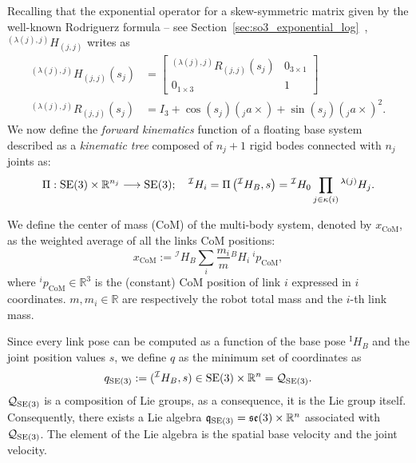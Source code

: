 Recalling that the exponential operator for a skew-symmetric matrix given by the well-known Rodriguerz formula -- see Section~\ref{sec:so3_exponential_log}~\citep{Murray1994}, ${}^{(\lambda(j), j)}H_{(j, j)}$ writes as
\begin{equation}
\begin{split}
	{}^{(\lambda(j), j)}H_{(j, j)}(s_j) &= \begin{bmatrix}
	{}^{(\lambda(j), j)}R_{(j, j)}(s_j)  & 0_{3 \times 1} \\
	0_{1 \times 3} & 1
	\end{bmatrix} \\
	{}^{(\lambda(j), j)}R_{(j, j)}(s_j) &= I_3 + \cos(s_j)({}_j a \times) + \sin(s_j)({}_j a \times)^2.
\end{split}
\end{equation}
We now define the \emph{forward kinematics} function of a floating base system described as a \emph{kinematic tree} composed of $n_j + 1$ rigid bodes connected with $n_j$ joints as:
\begin{equation}
    \operatorname{\Pi} : {\mathrm{SE}}(3) \times \mathbb{R}^{n_j} \longrightarrow {\mathrm{SE}}(3); \quad {}^\mathcal{I} H_i = \operatorname{\Pi}\left({}^\mathcal{I}H_B, {s}\right) = {}^\mathcal{I}H_0 \prod_{j \in \kappa(i)} {}^{\lambda(j)}H_{j}.
\end{equation}
\par
We define the center of mass (CoM) of the multi-body system, denoted by $x_\text{CoM}$, as the weighted average of all the links CoM positions:
 \begin{equation}\label{eq:com_definition}
 x_\text{CoM} := {}^\mathcal{I} H_B \sum_i \frac{m_i}{m}{}^{B} H _i  ~ {}^i p _{\text{CoM}},
 \end{equation}
where ${}^i p _ {\text{CoM}} \in \mathbb{R}^3$ is the (constant) CoM position of link $i$ expressed in $i$ coordinates. $m, m_i \in \mathbb{R}$ are respectively the robot total mass and the $i$-th link mass. 
\par
Since every link pose can be computed as a function of the base pose ${}^\mathrm{I} H _B $ and the joint position values $s$, we define $q$ as the minimum set of coordinates as 
\begin{equation}
q_{{\mathrm{SE}}(3)} := ({}^\mathcal{I}H_B, s) \in {\mathrm{SE}}(3) \times  \mathbb{R}^n = \mathcal{Q}_{{\mathrm{SE}}(3)}.
\end{equation}
$\mathcal{Q}_{{\mathrm{SE}}(3)}$ is a composition of Lie groups, as a consequence, it is the Lie group itself. Consequently, there exists a Lie algebra $\mathfrak{q}_{{\mathrm{SE}}(3)} = \mathfrak{se}(3) \times \mathbb{R}^n$ associated with $\mathcal{Q}_{{\mathrm{SE}}(3)}$. The element of the Lie algebra is the spatial base velocity and the joint velocity.
